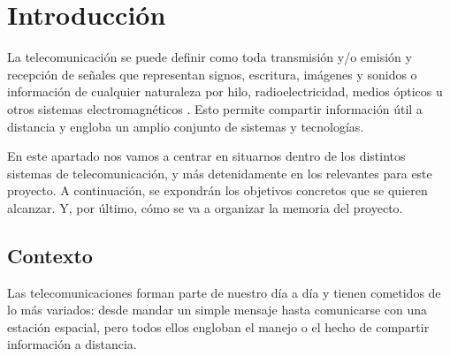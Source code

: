 
\chapter{Introducción}
\label{cap:introduccion}
\par La telecomunicación se puede definir como toda transmisión y/o emisión y recepción de señales que representan signos, escritura, imágenes y sonidos o información de cualquier naturaleza por hilo, radioelectricidad, medios ópticos u otros sistemas electromagnéticos \cite{RAI}. Esto permite compartir información útil a distancia y engloba un amplio conjunto de sistemas y tecnologías. 
\\
\par En este apartado nos vamos a centrar en situarnos dentro de los distintos sistemas de telecomunicación, y más detenidamente en los relevantes para este proyecto. A continuación, se expondrán los objetivos concretos que se quieren alcanzar. Y, por último, cómo se va a organizar la memoria del proyecto. 

\section{Contexto}
\par Las telecomunicaciones forman parte de nuestro día a día y tienen cometidos de lo más variados: desde mandar un simple mensaje hasta comunicarse con una estación espacial, pero todos ellos engloban el manejo o el hecho de compartir información a distancia. 

